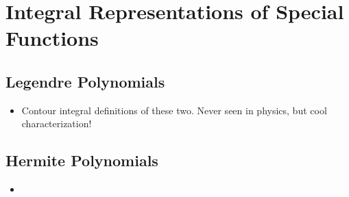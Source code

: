 \documentclass[../finalProject.tex]{subfiles}
\begin{document}
\section{Integral Representations of Special Functions}
\setcounter{subsection}{3}
\subsection{Legendre Polynomials}
\begin{itemize}
    \item {}Contour integral definitions of these two. Never seen in physics, but cool characterization!
\end{itemize}


\subsection{Hermite Polynomials}
\begin{itemize}
    \item 
\end{itemize}
\end{document}
